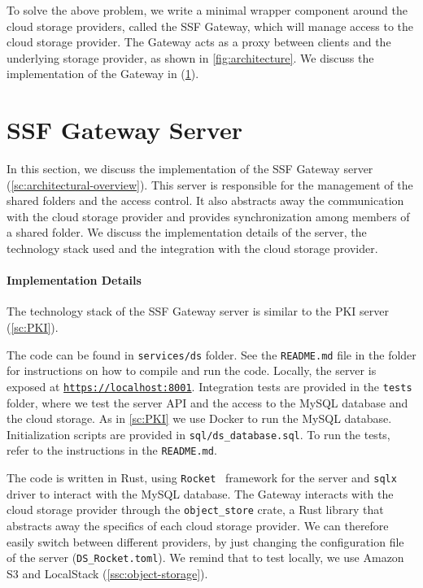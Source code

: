 To solve the above problem, we write a minimal wrapper component around
the cloud storage providers, called the SSF Gateway, which will manage
access to the cloud storage provider. The Gateway acts as a proxy
between clients and the underlying storage provider, as shown in
\cref{fig:architecture}. We discuss the implementation of the
Gateway in (\cref{sc:ssf-proxy-server}).


\section{SSF Gateway Server}\label{sc:ssf-proxy-server}

In this section, we discuss the implementation of the SSF Gateway server 
(\cref{sc:architectural-overview}). This server is responsible for the
management of the shared folders and the access control.
It also abstracts away the communication with the cloud storage provider
and provides synchronization among members of a shared folder.
We discuss the implementation details
of the server, the technology stack used and the
integration with the cloud storage provider.

\paragraph{Implementation Details}
The technology stack of the SSF Gateway server
is similar to the PKI server (\cref{sc:PKI}).

The code can be found in \texttt{services/ds} folder.
See the \texttt{README.md} file in the folder for instructions
on how to compile and run the code.
Locally, the server is exposed at \texttt{\url{https://localhost:8001}}.
Integration tests are provided in the \texttt{tests} folder,
where we test the server API and the access to the 
MySQL database and the cloud storage.
As in \cref{sc:PKI} we use Docker to run the MySQL database.
Initialization scripts are provided in \texttt{sql/ds\_database.sql}.
To run the tests, refer to the instructions in the \texttt{README.md}.

The code is written in Rust, using \texttt{Rocket}~\cite{Rocket}
framework for the server and \texttt{sqlx} driver to interact
with the MySQL database.
The Gateway interacts with the cloud storage provider
through the \texttt{object\_store} crate, a Rust library
that abstracts away the specifics of each cloud storage provider.
We can therefore easily switch between different providers, by
just changing the configuration file of the server (\texttt{DS\_Rocket.toml}).
We remind that to test locally, we use Amazon S3 and
LocalStack (\cref{ssc:object-storage}).

